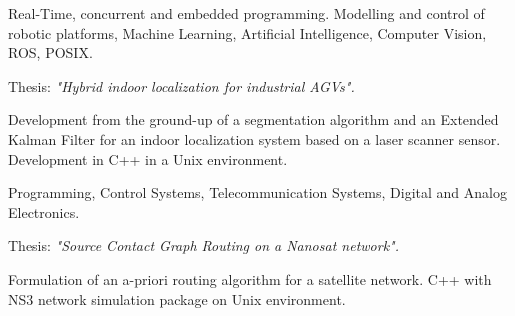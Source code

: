 \documentclass[11 pt,oneside,a4paper,titlepage]{article}
\begin{document}
{\begin{minipage}{11.3cm}
	{
		Real-Time, concurrent and embedded programming. 	
		Modelling and control of robotic platforms, Machine Learning, Artificial Intelligence, 
		Computer Vision, ROS, POSIX. 

		Thesis: \emph{"Hybrid indoor localization for industrial AGVs".}

		Development from the ground-up of a segmentation algorithm and an Extended Kalman Filter 
		for an indoor localization system based on a laser scanner sensor. 
		Development in C++ in a Unix environment.
	}
		
	\vspace*{0.22cm}
	{
		Programming, Control Systems, Telecommunication Systems, Digital and Analog Electronics.
		
		Thesis: \emph{"Source Contact Graph Routing on a Nanosat network".} 

		Formulation of an a-priori routing algorithm for a satellite network. 
		C++ with NS3 network simulation package on Unix environment.
	}
\end{minipage}} %

\newpage

\end{document}
